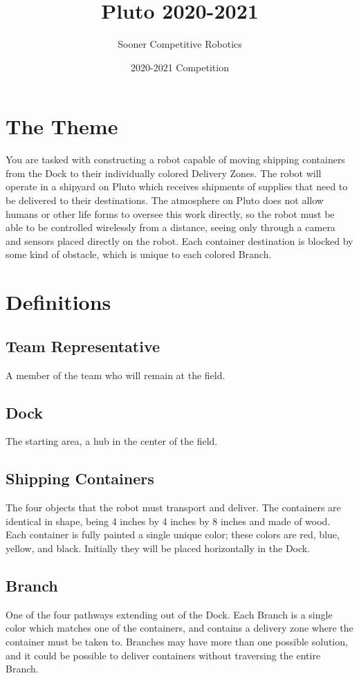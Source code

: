 \documentclass[a4paper,12pt]{article}
\title{Pluto 2020-2021}
\author{Sooner Competitive Robotics }
\date{2020-2021 Competition}
\begin{document}
\maketitle

\newpage

\let\cleardoublepage=\clearpage

\tableofcontents

\newpage

\section{The Theme}
You are tasked with constructing a robot capable of moving shipping containers from the Dock to their individually colored Delivery Zones. The robot will operate in a shipyard on Pluto which receives shipments of supplies that need to be delivered to their destinations. The atmosphere on Pluto does not allow humans or other life forms to oversee this work directly, so the robot must be able to be controlled wirelessly from a distance, seeing only through a camera and sensors placed directly on the robot. Each container destination is blocked by some kind of obstacle, which is unique to each colored Branch. 

\section{Definitions}
\subsection{Team Representative}
A member of the team who will remain at the field.

\subsection{Dock}
The starting area, a hub in the center of the field. 

\subsection{Shipping Containers}
The four objects that the robot must transport and deliver. The containers are identical in shape, being 4 inches by 4 inches by 8 inches and made of wood. Each container is fully painted a single unique color; these colors are red, blue, yellow, and black. Initially they will be placed horizontally in the Dock. 

\subsection{Branch}
One of the four pathways extending out of the Dock. Each Branch is a single color which matches one of the containers, and contains a delivery zone where the container must be taken to. Branches may have more than one possible solution, and it could be possible to deliver containers without traversing the entire Branch. 
\end{document}
